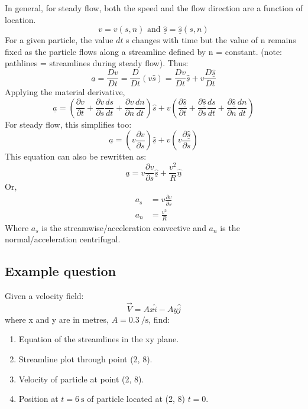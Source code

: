 \documentclass[class=report, crop=false, 12pt,a4paper]{standalone}
\begin{document}
In general, for steady flow, both the speed and the flow direction are a function of location.
\begin{equation} 
  v = v(s, n) \textrm{ and } \underline{\hat{s}} = \underline{\hat{s}}(s, n)
\end{equation}
For a given particle, the value \(dt \) s changes with time but the value of n remains fixed as the particle flows along a streamline defined by n = constant. (note: pathlines = streamlines during steady flow). Thus: 
\begin{equation} 
  \underline{a} = \frac{Dv}{Dt} = \frac{D}{Dt}(v\hat{s}) = \frac{Dv}{Dt}\underline{\hat{s}} + v \frac{D\underline{\hat{s}}}{Dt}
\end{equation}
Applying the material derivative,
\begin{equation}
  \underline{a} = \left( \frac{\partial v}{\partial t} + \frac{\partial v}{\partial s}\frac{ds}{dt} + \frac{\partial v}{\partial n}\frac{dn}{dt} \right) \hat{s} + v \left( \frac{\partial \underline{\hat{s}}}{\partial t} + \frac{\partial \underline{\hat{s}}}{\partial s}\frac{ds}{dt} + \frac{\partial \underline{\hat{s}}}{\partial n}\frac{dn}{dt} \right)
\end{equation}
For steady flow, this simplifies too:
\begin{equation} 
  \underline{a} = \left( v\frac{\partial v}{\partial s} \right) \underline{\hat{s}} + v \left( v\frac{\partial \underline{\hat{s}}}{\partial s} \right)
\end{equation}
This equation can also be rewritten as:
\begin{equation} 
  \underline{a} = v\frac{\partial v}{\partial s} \underline{\hat{s}} + \frac{v^2}{R} \underline{\hat{n}}
\end{equation}
Or,
\begin{align} 
  a_s &= v\frac{\partial v}{\partial s}\\
  a_n &= \frac{v^2}{R} 
\end{align}
Where \(a_s\) is the streamwise/acceleration convective and \(a_n\) is the normal/acceleration centrifugal.
\subsection{Example question}
Given a velocity field:
\begin{equation}
  \vec{V} = Ax\hat{i} - Ay\hat{j}
\end{equation}
where x and y are in metres, $A = 0.3 \ \si{\per\second}$, find:
\begin{enumerate}[noitemsep]
  \item Equation of the streamlines in the xy plane.
  \item Streamline plot through point (2, 8).
  \item Velocity of particle at point (2, 8).
  \item Position at $t = 6 \ \si{\second}$ of particle located at (2, 8) $t =0$.
\end{enumerate}
\end{document}
